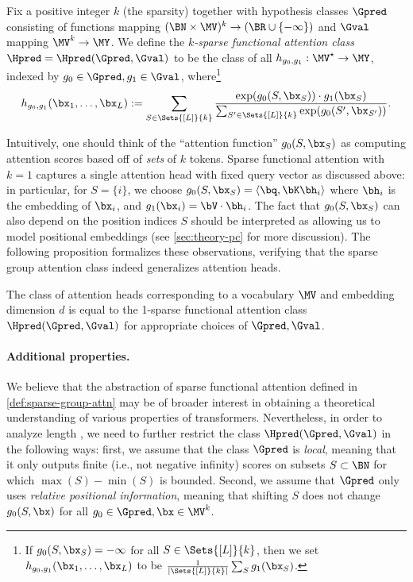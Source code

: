 \documentclass{article}
\newcommand{\arxiv}[1]{\iftoggle{icml}{}{#1}}
\begin{document}
\begin{definition}
  \label{def:sparse-group-attn}
  Fix a positive integer $k$ (the sparsity) together with hypothesis classes $\Gpred$ consisting of functions mapping $ {(\BN \times \MV)^k} \to (\BR \cup \{-\infty \})$ and $\Gval$ mapping  $\MV^k \to \MY$. %
  We define the \emph{$k$-sparse functional attention class} $\Hpred = \Hpred(\Gpred, \Gval)$ to be the class of all $h_{g_0, g_1} : \MV^\star \to \MY$, indexed by $g_0 \in \Gpred, g_1 \in \Gval$, where\footnote{If $g_0(S, \bx_S) = -\infty$ for all $S \in \Sets{[L]}{k}$, then we set $h_{g_0, g_1}(\bx_1, \ldots, \bx_L)$ to be $\frac{1}{|\Sets{[L]}{k}|} \sum_S g_1(\bx_S)$.}
  \begin{align}
h_{g_0, g_1}(\bx_1, \ldots, \bx_L) := \sum_{S \in \Sets{[L]}{k}} \frac{\exp(g_0(S, \bx_S)) \cdot g_1(\bx_S)}{\sum_{S' \in \Sets{[L]}{k}} \exp(g_0(S', \bx_{S'}))}\nonumber.
  \end{align}
\end{definition}

Intuitively, one should think of the ``attention function'' $g_0(S, \bx_S)$ as computing attention scores based off of \emph{sets} of $k$ tokens. Sparse functional attention with $k = 1$ captures a single attention head with fixed query vector as discussed above: in particular, for $S = \{ i \}$, we choose $g_0(S, \bx_S) = %
\langle \bq, \bK \bh_i \rangle$ where $\bh_i$ is the embedding of $\bx_i$, and %
$g_1(\bx_i) = \bV \cdot \bh_i$. The fact that $g_0(S, \bx_S)$ can also depend on the position indices $S$ should be interpreted as allowing us to model positional embeddings (see \cref{sec:theory-pc} for more discussion). 
The following proposition formalizes these observations, verifying that the sparse group attention class indeed generalizes attention heads.
\begin{proposition}
  \label{prop:model-attn-head}
  The class of attention heads corresponding to a \arxiv{fixed} vocabulary $\MV$ and embedding dimension $d$ is equal to the 1-sparse functional attention class $\Hpred(\Gpred, \Gval)$ for appropriate choices of $\Gpred, \Gval$. 
\end{proposition}

\paragraph{Additional properties.} We believe that the abstraction of sparse functional attention defined in \cref{def:sparse-group-attn} may be of broader interest in obtaining a theoretical understanding of various properties of transformers. Nevertheless, in order to analyze length \generalization, we need to further restrict the class $\Hpred(\Gpred, \Gval)$ in the following ways: first, we assume that the class $\Gpred$ is \emph{local}, meaning that it only outputs finite (i.e., not negative infinity) scores on subsets $S \subset \BN$ for which $\max(S) - \min(S)$ is bounded. Second, we assume that $\Gpred$ only uses \emph{relative positional information}, meaning that shifting $S$ does not change $g_0(S, \bx)$ for all $g_0 \in \Gpred, \bx \in \MV^k$.
\end{document}
